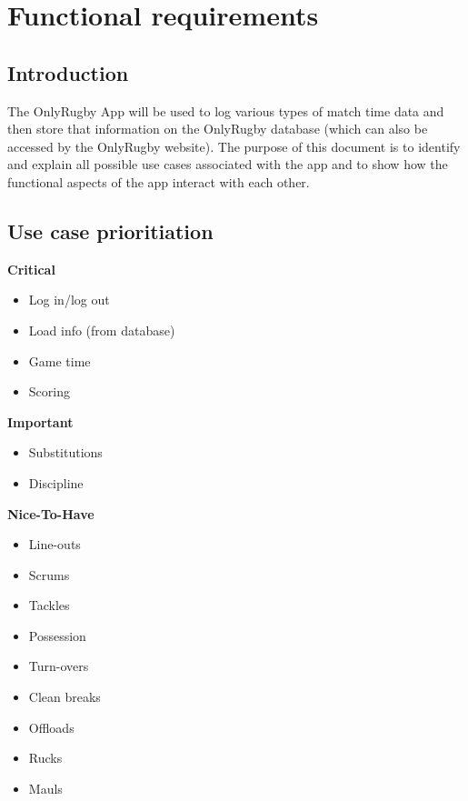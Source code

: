 \documentclass[a4paper,12pt]{report}
\begin{document}
\section{Functional requirements}
\subsection{Introduction}
The OnlyRugby App will be used to log various types of match time data and then store that information on the OnlyRugby database (which can also be accessed by the OnlyRugby website). The purpose of this document is to identify and explain all possible use cases associated with the app and to show how the functional aspects of the app interact with each other.
\subsection{Use case prioritiation}
\textbf{Critical} 
\begin{itemize}
  \item Log in/log out
  \item Load info (from database)
  \item Game time
  \item Scoring
\end{itemize}
\textbf{Important} 
\begin{itemize}
  \item Substitutions
  \item Discipline
\end{itemize}
\textbf{Nice-To-Have} 
\begin{itemize}
  \item Line-outs
  \item Scrums
  \item Tackles
  \item Possession 
  \item Turn-overs
  \item Clean breaks
  \item Offloads
  \item Rucks
  \item Mauls
\end{itemize}
\newpage
\end{document}
